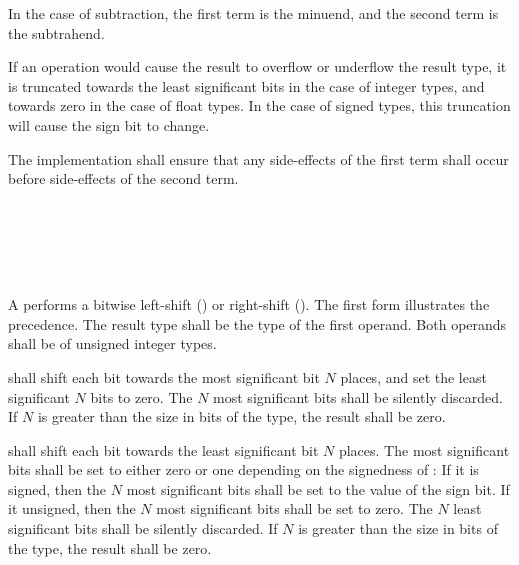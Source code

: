 \specsubsubitem
In the case of subtraction, the first term is the minuend, and the second term
is the subtrahend.

\specsubsubitem
If an operation would cause the result to overflow or underflow the result
type, it is truncated towards the least significant bits in the case of integer
types, and towards zero in the case of float types. In the case of signed
types, this truncation will cause the sign bit to change.

\specsubsubitem
The implementation shall ensure that any side-effects of the first term shall
occur before side-effects of the second term.


\begin{grammar}
 \\
	 \\
	 \terminal{\textless{}\textless{}}  \\
	 \terminal{\textgreater{}\textgreater{}}  \\
\end{grammar}

\specsubsubitem
A  performs a bitwise left-shift
(\terminal{\textless{}\textless{}}) or right-shift (\terminal{\textgreater{}\textgreater{}}). The first
form illustrates the precedence. The result type shall be the type of the first
operand. Both operands shall be of unsigned integer types.

\specsubsubitem
{} shall shift
each bit towards the most significant bit $N$ places, and set the least
significant $N$ bits to zero. The $N$ most significant bits shall be silently
discarded. If $N$ is greater than the size in bits of the type, the result shall
be zero.


\specsubsubitem
{} shall shift each bit towards the least significant bit $N$ places. The most
significant bits shall be set to either zero or one depending on the signedness
of : If it is signed, then the $N$ most
significant bits shall be set to the value of the sign bit. If it unsigned, then
the $N$ most significant bits shall be set to zero. The $N$ least significant
bits shall be silently discarded. If $N$ is greater than the size in bits of the
type, the result shall be zero.

